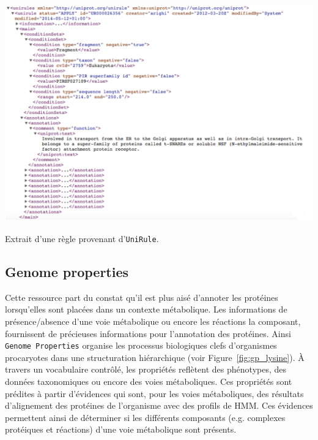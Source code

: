 \begin{refsegment}
    \begin{shadedfigure}[H]
        \centering
        \includegraphics[width=\textwidth]{img/regle_unirule.png}
        \caption{Extrait d'une règle provenant d'\texttt{UniRule}. }
        \label{fig:regle_unirule}
    \end{shadedfigure}
    
    
    
    \subsection{Genome properties}
    
    Cette ressource part du constat qu'il est plus aisé d'annoter les protéines lorsqu'elles sont placées dans un contexte métabolique. Les informations de présence/absence d'une voie métabolique ou encore les réactions la composant, fournissent de précieuses informations pour l'annotation des protéines. Ainsi \texttt{Genome Properties} \cite{selengut2007tigrfams,haft2005genome,haft2013tigrfams} organise les processus biologiques clefs d'organismes procaryotes dans une structuration hiérarchique (voir Figure~\cref{fig:gp_lysine}). À travers un vocabulaire contrôlé, les propriétés reflètent des phénotypes, des données taxonomiques ou encore des voies métaboliques.  Ces propriétés sont prédites à partir d’évidences qui sont, pour les voies métaboliques, des résultats d’alignement des protéines de l’organisme avec des profils de \gls{HMM}. Ces évidences permettent ainsi de déterminer si les différents composants (e.g. complexes protéiques et réactions) d’une voie métabolique sont présents. 
    

\end{refsegment}

